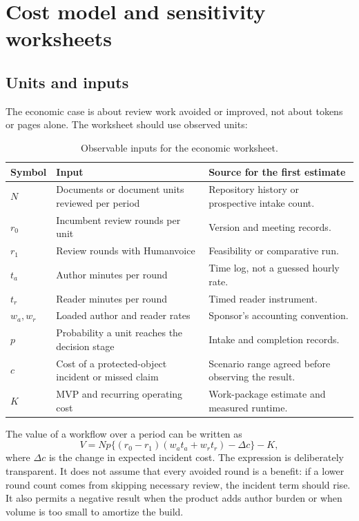 \section{Cost model and sensitivity worksheets}
\label{app:cost-worksheets}

\subsection{Units and inputs}

The economic case is about review work avoided or improved, not about tokens
or pages alone. The worksheet should use observed units:

\begin{table}[H]
\centering
\small
\begin{tabularx}{\textwidth}{@{}p{}p{}L@{}}
\toprule
Symbol & Input & Source for the first estimate \\
\midrule
$N$ & Documents or document units reviewed per period & Repository history or
prospective intake count. \\
$r_0$ & Incumbent review rounds per unit & Version and meeting records. \\
$r_1$ & Review rounds with Humanvoice & Feasibility or comparative run. \\
$t_a$ & Author minutes per round & Time log, not a guessed hourly rate. \\
$t_r$ & Reader minutes per round & Timed reader instrument. \\
$w_a,w_r$ & Loaded author and reader rates & Sponsor's accounting convention. \\
$p$ & Probability a unit reaches the decision stage & Intake and completion
records. \\
$c$ & Cost of a protected-object incident or missed claim & Scenario range
agreed before observing the result. \\
$K$ & MVP and recurring operating cost & Work-package estimate and measured
runtime. \\
\bottomrule
\end{tabularx}
\caption{Observable inputs for the economic worksheet.}
\label{tab:cost-inputs}
\end{table}

The value of a workflow over a period can be written as
\[
  V=Np\{(r_0-r_1)(w_at_a+w_rt_r)-\Delta c\}-K,
\]
where $\Delta c$ is the change in expected incident cost. The expression is
deliberately transparent. It does not assume that every avoided round is a
benefit: if a lower round count comes from skipping necessary review, the
incident term should rise. It also permits a negative result when the product
adds author burden or when volume is too small to amortize the build.

